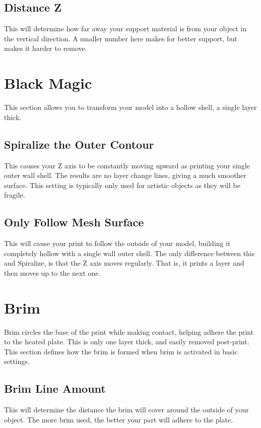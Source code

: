 \subsection{Distance Z}
This will determine how far away your support material is from your object in the vertical direction. A smaller number here makes for better support, but makes it harder to remove.

\section{Black Magic}
This section allows you to transform your model into a hollow shell, a single layer thick.

\subsection{Spiralize the Outer Contour}
This causes your Z axis to be constantly moving upward as printing your single outer wall shell. The results are no layer change lines, giving a much smoother surface. This setting is typically only used for artistic objects as they will be fragile.

\subsection{Only Follow Mesh Surface}
This will cause your print to follow the outside of your model, building it completely hollow with a single wall outer shell. The only difference between this and Spiralize, is that the Z axis moves regularly. That is, it prints a layer and then moves up to the next one.

\section{Brim}
Brim circles the base of the print while making contact, helping adhere the print to the heated plate. This is only one layer thick, and easily removed post-print. This section defines how the brim is formed when brim is activated in basic settings.

\subsection{Brim Line Amount}
This will determine the distance the brim will cover around the outside of your object. The more brim used, the better your part will adhere to the plate. 

